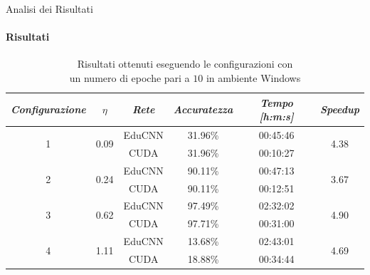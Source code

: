 \documentclass[
 ]{beamer}
\begin{document}
\begin{frame}{Analisi dei Risultati}
    \framesubtitle{Risultati}

        \begin{table}
            \centering
            \renewcommand\arraystretch{1.3}
            \small
            \begin{tabular}{| c | c | c | c | c | c |}
                \hline
                \emph{Configurazione} & $\eta$ & \emph{Rete} & \emph{Accuratezza} & \emph{Tempo [h:m:s]} & \emph{Speedup} \\
                \hline
                \multirow{2}{*}{1} & \multirow{2}{*}{0.09} & EduCNN & 31.96\% & 00:45:46 & \multirow{2}{*}{4.38} \\ \cline{3-5} 
                                   &                       & CUDA   & 31.96\% & 00:10:27 & \\
                \hline
                \multirow{2}{*}{2} & \multirow{2}{*}{0.24} & EduCNN & 90.11\% & 00:47:13 & \multirow{2}{*}{3.67} \\ \cline{3-5} 
                                   &                       & CUDA   & 90.11\% & 00:12:51 & \\
                \hline
                \multirow{2}{*}{3} & \multirow{2}{*}{0.62} & EduCNN & 97.49\% & 02:32:02 & \multirow{2}{*}{4.90} \\ \cline{3-5} 
                                   &                       & CUDA   & 97.71\% & 00:31:00 & \\
                \hline
                \multirow{2}{*}{4} & \multirow{2}{*}{1.11} & EduCNN & 13.68\% & 02:43:01 & \multirow{2}{*}{4.69} \\ \cline{3-5} 
                                   &                       & CUDA   & 18.88\% & 00:34:44 & \\
                \hline
            \end{tabular}
            \caption            
    {Risultati ottenuti eseguendo le configurazioni con \\ un numero di epoche pari a $10$ in ambiente Windows\endtabular}          
        \end{table}    
\end{frame}




\end{document}
